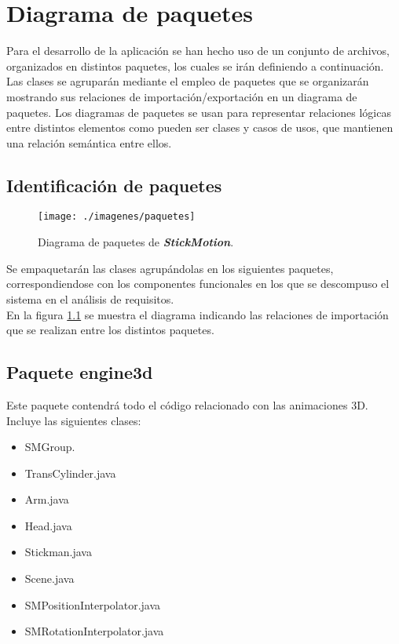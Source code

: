 \chapter{Diagrama de paquetes}
Para el desarrollo de la aplicación se han hecho uso de un conjunto de archivos, organizados en distintos paquetes, los cuales se 
irán definiendo a continuación.\\

Las clases se agruparán mediante el empleo de paquetes que se organizarán mostrando sus relaciones de importación/exportación en un
diagrama de paquetes. Los diagramas de paquetes se usan para representar relaciones lógicas entre distintos elementos como pueden ser
clases y casos de usos, que mantienen una relación semántica entre ellos. \\

   \section{Identificación de paquetes}
   \begin{figure} [H] \begin{center}
   \texttt{[image: ./imagenes/paquetes]}\label{DiagramaPaquetes}
   \caption{Diagrama de paquetes de \textbf{\textit{StickMotion}}.}
   \end{center} \end{figure}
   Se empaquetarán las clases agrupándolas en los siguientes paquetes, correspondiendose con los componentes funcionales en los que se
   descompuso el sistema en el análisis de requisitos. \\

   En la figura \ref{DiagramaPaquetes} se muestra el diagrama indicando las relaciones de importación que se realizan entre los distintos
   paquetes. \\


   \section{Paquete engine3d}
   Este paquete contendrá todo el código relacionado con las animaciones 3D. Incluye las siguientes clases:
   \begin{itemize}
      \item SMGroup.
      \item TransCylinder.java
      \item Arm.java
      \item Head.java
      \item Stickman.java
      \item Scene.java
      \item SMPositionInterpolator.java
      \item SMRotationInterpolator.java
   \end{itemize}


